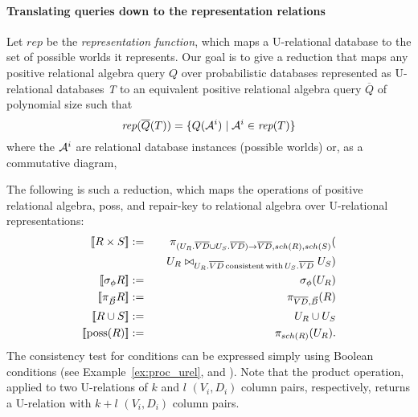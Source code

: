 \paragraph{Translating queries down to the representation relations}
Let $\textit{rep}$ be the {\em representation function}\/, which
maps a U-relational data\-base to the set of possible worlds it represents.
Our goal is to give a reduction that maps
any positive relational algebra query $Q$ over probabilistic databases represented as U-relational
databases \textit{T} to an equivalent positive relational algebra query
$\overline{Q}$ of polynomial size such that
\[
\textit{rep}(\overline{Q}(T)) =
   \{Q({\cal A}^i) \mid {\cal A}^i \in \textit{rep}(T)\}
\]
where the ${\cal A}^i$ are relational database instances (possible worlds)
or, as a commutative diagram,
\vspace*{1em}
  \begin{center}
  \end{center}


The following is such a reduction, which maps the
operations of positive relational algebra, poss, and repair-key
to relational algebra over U-relational representations:
\begin{eqnarray*}
\Bracks{R \times S} &:=&
  \pi_{(U_R.\overline{VD} \cup U_S.\overline{VD}) \rightarrow \overline{VD}, sch(R), sch(S)}( \\
&& \quad U_R \bowtie_{U_R.\overline{VD} \,\mathrm{consistent \, with}\, U_S.\overline{VD}} U_S)
\\
\Bracks{\sigma_\phi R} &:=& \sigma_\phi(U_R)
\\
\Bracks{\pi_{\vec{B}} R} &:=& \pi_{\overline{VD}, \vec{B}}(R)
\\
\Bracks{R \cup S} &:=& U_R \cup U_S
\\
\Bracks{\mbox{poss}(R)} &:=& \pi_{sch(R)}(U_R).
\end{eqnarray*}
The consistency test for conditions can be expressed simply using Boolean conditions (see Example~\ref{ex:proc_urel}, and \cite{AJKO2008}).
Note that the product operation, applied to two U-relations of $k$ and $l$ $(V_i, D_i)$ column pairs, respectively, returns a U-relation with $k+l$ $(V_i, D_i)$ column pairs.

